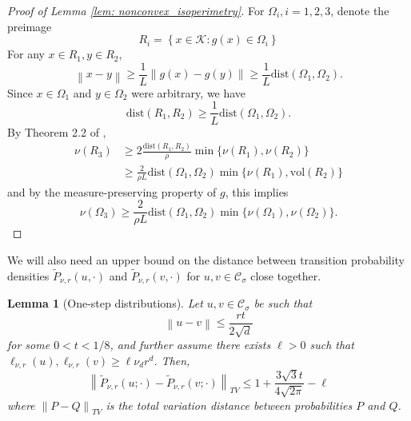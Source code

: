 \documentclass{article}
\newcommand{\set}[1]{\left\{#1\right\}}
\newcommand{\vol}{\mathrm{vol}}
\newcommand{\norm}[1]{\left\lVert#1\right\rVert}
\newcommand{\1}{\mathbf{1}}
\newcommand{\dist}{\mathrm{dist}}
\newcommand{\Cset}{\mathcal{C}}
\newcommand{\Csig}{\Cset_{\sigma}}
\theoremstyle{aldenthm}
\newtheorem{lemma}{Lemma}
\theoremstyle{aldenrmrk}
\begin{document}
\begin{proof}[Proof of Lemma \ref{lem: nonconvex_isoperimetry}]
	For $\Omega_i, i = 1,2,3$, denote the preimage
	\begin{equation*}
	R_i = \set{x \in \mathcal{K}: g(x) \in \Omega_i}
	\end{equation*}
	For any $x \in R_1, y \in R_2$, 
	\begin{equation*}
	\norm{x - y} \geq \frac{1}{L}\norm{g(x) - g(y)} \geq \frac{1}{L} \dist(\Omega_1, \Omega_2). 
	\end{equation*}
	Since $x \in \Omega_1$ and $y \in \Omega_2$ were arbitrary, we have
	\begin{equation*}
	\dist(R_1, R_2) \geq \frac{1}{L} \dist(\Omega_1, \Omega_2).
	\end{equation*}
	By Theorem 2.2 of \cite{lovasz1990},
	\begin{align*}
	\nu(R_3) & \geq 2\frac{\dist(R_1, R_2)}{\rho} \min \{\nu(R_1), \nu(R_2)\} \\
	& \geq \frac{2}{\rho L} \dist(\Omega_1, \Omega_2) \min\{\nu(R_1), \vol(R_2)\}
	\end{align*}
	and by the measure-preserving property of $g$, this implies
	\begin{equation*}
	\nu(\Omega_3) \geq\frac{2}{\rho L} \dist(\Omega_1, \Omega_2) \min\{\nu(\Omega_1), \nu(\Omega_2)\}.
	\end{equation*}
\end{proof}

We will also need an upper bound on the distance between transition probability densities $\widetilde{P}_{\nu,r}(u,\cdot)$ and $\widetilde{P}_{\nu,r}(v,\cdot)$ for $u,v \in \Csig$ close together. 
\begin{lemma}[One-step distributions]
	\label{lem: one_step_distributions}
	Let $u,v \in \Csig$ be such that 
	\begin{equation*}
	\norm{u - v} \leq \frac{r t}{2\sqrt{d}}
	\end{equation*}
	for some $0 < t < 1/8$, and further assume there exists $\ell > 0$ such that $\ell_{\nu,r}(u), \ell_{\nu,r}(v) \geq \ell \nu_d r^d$. Then,
	\begin{equation*}
	\norm{\widetilde{P}_{\nu,r}(u; \cdot) - \widetilde{P}_{\nu,r}(v; \cdot)}_{TV} \leq 1 + \frac{3 \sqrt{3} t}{4\sqrt{2\pi}} - \ell
	\end{equation*}
	where $\norm{P - Q}_{TV}$ is the total variation distance between probabilities $P$ and $Q$. 
\end{lemma}
\end{document}
